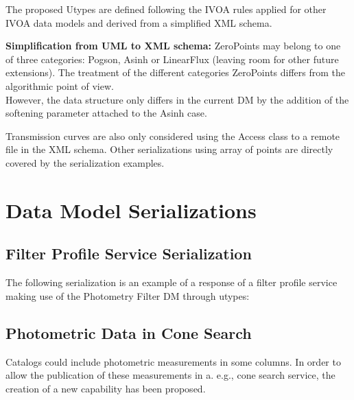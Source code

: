 \documentclass[11pt,a4paper]{ivoa}
\begin{document}
\begin{appendices}
The proposed Utypes are defined following the IVOA rules applied for other IVOA data models and derived from a simplified XML schema.
\par

\textbf{Simplification from UML to XML schema:}
ZeroPoints may belong to one of three categories: Pogson, Asinh or LinearFlux (leaving room for other future extensions). The treatment of the different categories ZeroPoints differs from the algorithmic point of view. \\
However, the data structure only differs in the current DM by the addition of the softening parameter attached to the Asinh case.
\par

Transmission curves are also only considered using the Access class to a remote file in the XML schema. Other serializations using array of points are directly covered by the serialization examples.
\par

\section{Data Model Serializations} \label{serialization}
\subsection{Filter Profile Service Serialization} \label{serializationfilter}

    
The following serialization is an example of a response of a filter profile service making use of the Photometry Filter DM through utypes:
\par


\subsection{Photometric Data in Cone Search}
Catalogs could include photometric measurements in some columns. In order to allow the publication of these measurements in a. e.g., cone search service, the creation of a new capability has been proposed.
\par


\end{appendices}
\end{document}
